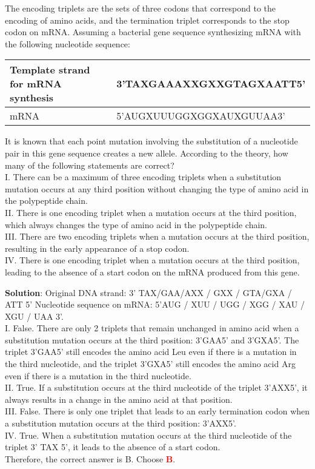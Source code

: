 \documentclass{article}
\begin{document}
{\begin{mdframed}[linewidth=1pt,linecolor=red]
		The encoding triplets are the sets of three codons that correspond to the encoding of amino acids, and the termination triplet corresponds to the stop codon on mRNA. Assuming a bacterial gene sequence synthesizing mRNA with the following nucleotide sequence:
		
		\begin{tabular}{|l|l|}
			\hline
			Template strand for mRNA synthesis & 3'TAXGAAAXXGXXGTAGXAATT5' \\ \hline
			mRNA                               & 5'AUGXUUUGGXGGXAUXGUUAA3' \\ \hline
		\end{tabular}
		
		
		
		It is known that each point mutation involving the substitution of a nucleotide pair in this gene sequence creates a new allele. According to the theory, how many of the following statements are correct?\\
		I. There can be a maximum of three encoding triplets when a substitution mutation occurs at any third position without changing the type of amino acid in the polypeptide chain.\\
		II. There is one encoding triplet when a mutation occurs at the third position, which always changes the type of amino acid in the polypeptide chain.\\
		III. There are two encoding triplets when a mutation occurs at the third position, resulting in the early appearance of a stop codon.\\
		IV. There is one encoding triplet when a mutation occurs at the third position, leading to the absence of a start codon on the mRNA produced from this gene.
		
		\begin{oneparchoices}
		\end{oneparchoices}
		
		\textbf{Solution}: Original DNA strand: 3' TAX/GAA/AXX / GXX / GTA/GXA / ATT 5'
		Nucleotide sequence on mRNA: 5'AUG / XUU / UGG / XGG / XAU / XGU / UAA 3'.\\
		I. False. There are only 2 triplets that remain unchanged in amino acid when a substitution mutation occurs at the third position: 3'GAA5' and 3'GXA5'. The triplet 3’GAA5' still encodes the amino acid Leu even if there is a mutation in the third nucleotide, and the triplet 3'GXA5' still encodes the amino acid Arg even if there is a mutation in the third nucleotide.\\
		II. True. If a substitution occurs at the third nucleotide of the triplet 3'AXX5', it always results in a change in the amino acid at that position.\\
		III. False. There is only one triplet that leads to an early termination codon when a substitution mutation occurs at the third position: 3'AXX5'.\\
		IV. True. When a substitution mutation occurs at the third nucleotide of the triplet 3' TAX 5', it leads to the absence of a start codon.\\
		Therefore, the correct answer is B. Choose \textcolor{red}{\textbf{B}}. 
		

\end{mdframed}}
\end{document}
